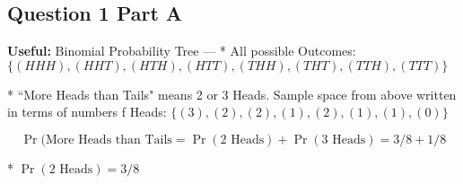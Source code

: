 




\subsection*{Question 1 Part A}

\noindent \textbf{Useful:} Binomial Probability Tree 
--- 
* All possible Outcomes:
$\{ (HHH), (HHT), (HTH), (HTT) , (THH), (THT), (TTH),(TTT)\} $



* ``More Heads than Tails" means 2 or 3 Heads. Sample space from above written in terms of numbers f Heads: $\{ (3), (2), (2), (1), (2),(1),(1),(0)\} $

\[ \Pr(\mbox{More Heads than Tails} = \Pr(\mbox{2 Heads}) + \Pr(\mbox{3 Heads}) = 3/8 + 1/8 \]

* $ \Pr(\mbox{2 Heads}) = 3/8 $






